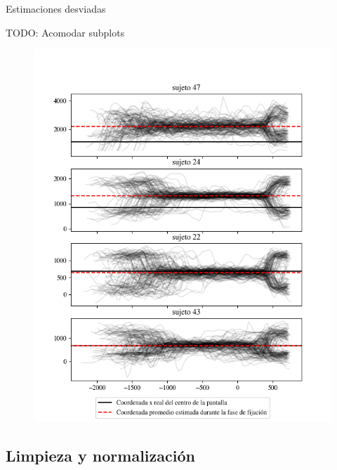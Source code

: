 \documentclass[aspectratio=169]{beamer}
\begin{document}
\begin{frame}{Estimaciones desviadas}

  TODO: Acomodar subplots
  \begin{figure}
    \includegraphics[width=0.8\linewidth]{img/skewed-estimations-examples.png}
  \end{figure}

\end{frame}

\subsection{Limpieza y normalización}
\end{document}
